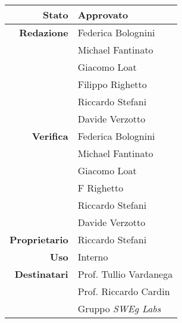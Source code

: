 \thispagestyle{empty} %

\begin{center}
\begin{tabular}{r|l}
    \textbf{Stato} & Approvato \\
    \hline
    \textbf{Redazione} & Federica Bolognini \\
                       & Michael Fantinato \\
                       & Giacomo Loat \\
                       & Filippo Righetto \\
                       & Riccardo Stefani \\
                       & Davide Verzotto \\
    \hline
    \textbf{Verifica} & Federica Bolognini \\
                      & Michael Fantinato \\
                      & Giacomo Loat \\
                      & F Righetto \\
                      & Riccardo Stefani \\
                      & Davide Verzotto \\
    \hline
    \textbf{Proprietario} & Riccardo Stefani \\
    \hline
    \textbf{Uso} & Interno \\
    \hline
    \textbf{Destinatari} & Prof. Tullio Vardanega \\
                         & Prof. Riccardo Cardin \\
                         & Gruppo \emph{SWEg Labs} \\
\end{tabular}
\end{center}
    
